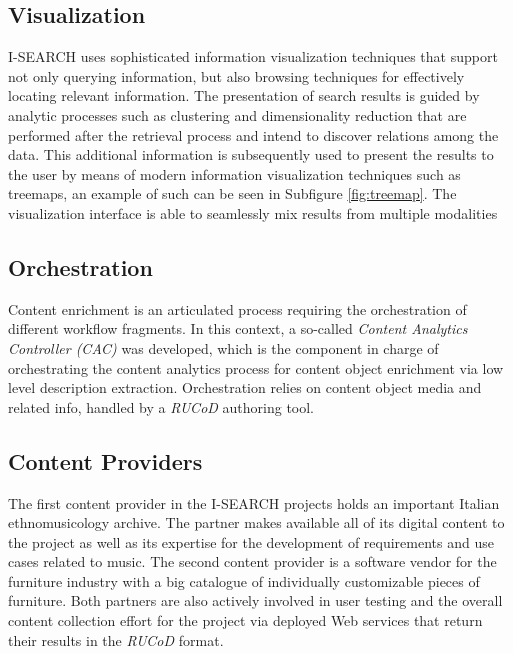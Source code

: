 \documentclass{acm_proc_article-sp}
\let\oldemph\emph
\renewcommand{\emph}[1]{\oldemph{\fontsize{9}{9}\selectfont #1}}
\begin{document}
\subsection{Visualization}
\mbox{I-SEARCH} uses sophisticated information visualization techniques that support not only querying information, but also browsing techniques for effectively locating relevant information.
The presentation of search results is guided by analytic processes such as clustering and dimensionality reduction that are performed after the retrieval process and intend to discover relations among the data.
This additional information is subsequently used to present the results to the user by means of modern information visualization techniques such as treemaps, an example of such can be seen in Subfigure \autoref{fig:treemap}.
The visualization interface is able to seamlessly mix results from multiple modalities
 
\subsection{Orchestration}
Content enrichment is an articulated process requiring the orchestration of different workflow fragments.
In this context, a so-called \emph{Content Analytics Controller (CAC)} was developed, which is the component in charge of orchestrating the content analytics process for content object enrichment via low level description extraction.
Orchestration relies on content object media and related info, handled by a \mbox{\emph{RUCoD}} authoring tool.

\subsection{Content Providers}
The first content provider in the \mbox{I-SEARCH} projects holds an important Italian ethnomusicology archive.
The partner makes available all of its digital content to the project as well as its expertise for the development of requirements and use cases related to music.
The second content provider is a software vendor for the furniture industry with a big catalogue of individually customizable pieces of furniture. 
Both partners are also actively involved in user testing and the overall content collection effort for the project via deployed Web services that return their results in the \mbox{\emph{RUCoD}} format.
\end{document}
